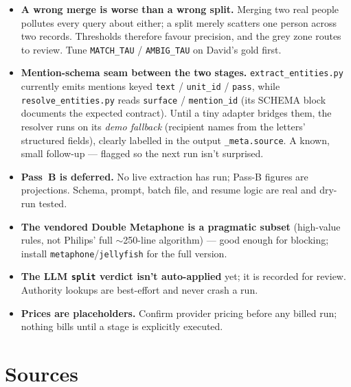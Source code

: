 \documentclass[11pt]{article}
\newcommand{\code}[1]{\texttt{#1}}
\begin{document}
\begin{cautionbox}
\begin{itemize}[leftmargin=*]
  \item \textbf{A wrong merge is worse than a wrong split.} Merging two real people
        pollutes every query about either; a split merely scatters one person across
        two records. Thresholds therefore favour precision, and the grey zone routes
        to review. Tune \code{MATCH\_TAU} / \code{AMBIG\_TAU} on David's gold first.
  \item \textbf{Mention-schema seam between the two stages.}
        \code{extract\_entities.py} currently emits mentions keyed \code{text} /
        \code{unit\_id} / \code{pass}, while \code{resolve\_entities.py} reads
        \code{surface} / \code{mention\_id} (its SCHEMA block documents the expected
        contract). Until a tiny adapter bridges them, the resolver runs on its
        \emph{demo fallback} (recipient names from the letters' structured fields),
        clearly labelled in the output \code{\_meta.source}. A known, small
        follow-up --- flagged so the next run isn't surprised.
  \item \textbf{Pass~B is deferred.} No live extraction has run; Pass-B figures are
        projections. Schema, prompt, batch file, and resume logic are real and
        dry-run tested.
  \item \textbf{The vendored Double Metaphone is a pragmatic subset} (high-value
        rules, not Philips' full $\sim$250-line algorithm) --- good enough for
        blocking; install \code{metaphone}/\code{jellyfish} for the full version.
  \item \textbf{The LLM \code{split} verdict isn't auto-applied} yet; it is recorded
        for review. Authority lookups are best-effort and never crash a run.
  \item \textbf{Prices are placeholders.} Confirm provider pricing before any billed
        run; nothing bills until a stage is explicitly executed.
\end{itemize}
\end{cautionbox}

\section{Sources}
\end{document}

